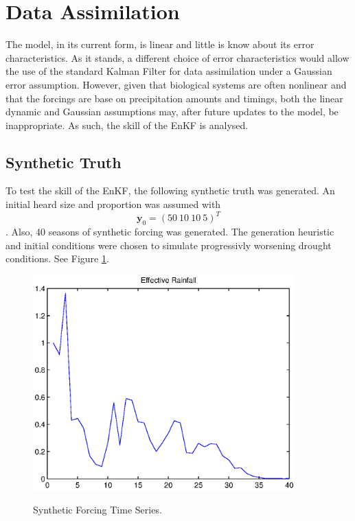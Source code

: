 \documentclass[fleqn, letterpaper]{amsart}
\newcommand{\vecy}{\mathbf{y}}
\begin{document}
\section{Data Assimilation}
The model, in its current form, is linear and little is know about its error characteristics.
As it stands, a different choice of error characteristics would allow the use of the  standard Kalman Filter for data assimilation under a Gaussian error assumption.
However, given that biological systems are often nonlinear and that the forcings are base on precipitation amounts and timings, both the linear dynamic and Gaussian assumptions may, after future updates to the model, be inappropriate.  As such, the skill of the EnKF is analysed. 

\subsection{Synthetic Truth}
To test the skill of the EnKF, the following synthetic truth was generated. An initial heard size and proportion was assumed with
\[\vecy_0 = (50\ 10\ 10\ 5)^T\].
Also, 40 seasons of synthetic forcing was generated. The generation heuristic and initial conditions were chosen to simulate progressivly worsening drought conditions. See Figure \ref{forcing}.
\begin{figure}
\begin{center}
\includegraphics[width=0.9\textwidth]{rforcing}
\label{forcing}
\caption{Synthetic Forcing Time Series.}
\end{center}
\end{figure}
\end{document}
